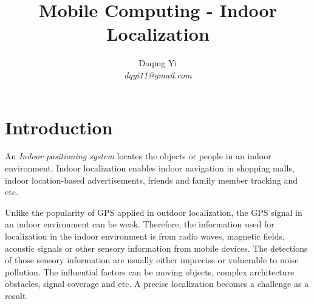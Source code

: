 \documentclass[letterpaper]{article}
\begin{document}
%
\title{Mobile Computing - Indoor Localization}

\author{Daqing Yi\\
\emph{dqyi11@gmail.com}
}
\maketitle

\section{Introduction}

An \emph{Indoor positioning system} locates the objects or people in an indoor environment.
Indoor localization enables indoor navigation in shopping malls, indoor location-based advertisements, friends and family member tracking and etc.

Unlike the popularity of GPS applied in outdoor localization, the GPS signal in an indoor environment can be weak.
Therefore, the information used for localization in the indoor environment is from radio waves, magnetic fields, acoustic signals or other sensory information from mobile devices.
The detections of those sensory information are usually either imprecise or vulnerable to noise pollution.
The influential factors can be moving objects,  complex architecture obstacles, signal coverage and etc.
A precise localization becomes a challenge as a result.
\end{document}

